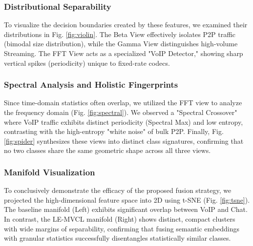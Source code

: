 \subsubsection{Distributional Separability}
To visualize the decision boundaries created by these features, we examined their distributions in Fig. \ref{fig:violin}. The Beta View effectively isolates P2P traffic (bimodal size distribution), while the Gamma View distinguishes high-volume Streaming. The FFT View acts as a specialized "VoIP Detector," showing sharp vertical spikes (periodicity) unique to fixed-rate codecs.

\subsubsection{Spectral Analysis and Holistic Fingerprints}
Since time-domain statistics often overlap, we utilized the FFT view to analyze the frequency domain (Fig. \ref{fig:spectral}). We observed a "Spectral Crossover" where VoIP traffic exhibits distinct periodicity (Spectral Max) and low entropy, contrasting with the high-entropy "white noise" of bulk P2P. Finally, Fig. \ref{fig:spider} synthesizes these views into distinct class signatures, confirming that no two classes share the same geometric shape across all three views.

\subsubsection{Manifold Visualization}
To conclusively demonstrate the efficacy of the proposed fusion strategy, we projected the high-dimensional feature space into 2D using t-SNE (Fig. \ref{fig:tsne}). The baseline manifold (Left) exhibits significant overlap between VoIP and Chat. In contrast, the LE-MVCL manifold (Right) shows distinct, compact clusters with wide margins of separability, confirming that fusing semantic embeddings with granular statistics successfully disentangles statistically similar classes.

